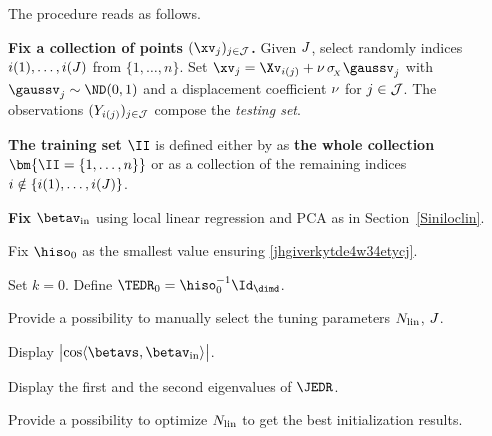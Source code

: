 The procedure reads as follows.
\begin{mylist}

\item 
\textbf{Fix a collection of points \( (\xv_{j})_{j \in \JJJ} \).}
Given \( J \), select randomly indices \( i(1), \ldots, i(J) \) from \( \{ 1,\ldots,n \} \).
Set \( \xv_{j} = \Xv_{i(j)} + \displ \, \sigmaX \gaussv_{j} \) with \( \gaussv_{j} \sim \ND(0,1) \)
and a displacement coefficient \( \nu \) for \( j \in \mathcal{J} \).
The observations \( (Y_{i(j)})_{j \in \mathcal{J}} \) compose the \emph{testing set}.

\item
\textbf{The training set \( \II \)} is defined either by as \textbf{the whole collection} \( \bm{\II = \{ 1,\ldots,n \} } \)
or as a collection of the remaining indices \( i \notin \{ i(1), \ldots, i(J) \} \).

\item
\textbf{Fix} \( \betav_{\init} \) using local linear regression and PCA as
in Section~\ref{Siniloclin}.


\item
Fix \( \hiso_{0} \) as the smallest value ensuring \eqref{jhgiverkytde4w34etycj}.

\item
Set \( k=0 \).
Define \( \TEDR_{0} = \hiso_{0}^{-1} \Id_{\dimd} \).
\end{mylist}

{\color{blue} 
\begin{mylist}
	\item
	Provide a possibility to manually select the tuning parameters \( N_{\operatorname{lin}} \), \( J \).

	\item
	Display \( \bigl| \cos\langle \betavs,\betav_{\init} \rangle \bigr| \).
	
	\item
	Display the first and the second eigenvalues of \( \JEDR \).
	
	\item
	Provide a possibility to optimize \( N_{\operatorname{lin}} \)
	to get the best initialization results.
	
	
\end{mylist}
}

